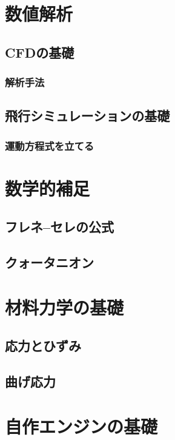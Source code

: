 \documentclass[uplatex,dvipdfmx,a4j,11pt]{jsreport}
\numberwithin{equation}{chapter}
\begin{document}
\chapter{数値解析}

\section{CFDの基礎}
\subsection{解析手法}

\section{飛行シミュレーションの基礎}
\subsection{運動方程式を立てる}


\appendix

\chapter{数学的補足}
\section{フレネ--セレの公式}

\section{クォータニオン}

\chapter{材料力学の基礎}
\section{応力とひずみ}

\section{曲げ応力}

\chapter{自作エンジンの基礎}
\end{document}
